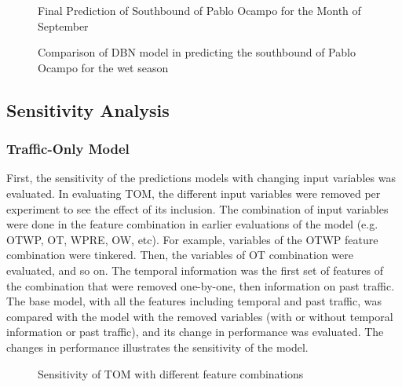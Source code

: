 \begin{figure}
  \centering
  \captionsetup{justification=centering}
  \caption{Final Prediction of Southbound of Pablo Ocampo for the Month of September}
  \label{fig:final_prediction}
\end{figure}


\begin{figure}
  \centering
  \captionsetup{justification=centering}
  \caption{Comparison of DBN model in predicting the southbound of Pablo Ocampo for the wet season}
  \label{fig:dbn_comp_pocampo}
\end{figure}



\subsection{Sensitivity Analysis}

\subsubsection{Traffic-Only Model}

First, the sensitivity of the predictions models with changing input variables was evaluated. In evaluating TOM, the different input variables were removed per experiment to see the effect of its inclusion. The combination of input variables were done in the feature combination in earlier evaluations of the model (e.g. OTWP, OT, WPRE, OW, etc). For example, variables of the OTWP feature combination were tinkered. Then, the variables of OT combination were evaluated, and so on. The temporal information was the first set of features of the combination that were removed one-by-one, then information on past traffic. The base model, with all the features including temporal and past traffic, was compared with the model with the removed variables (with or without temporal information or past traffic), and its change in performance was evaluated. The changes in performance illustrates the sensitivity of the model. 

\begin{figure}
  \centering
  \captionsetup{justification=centering}
  \caption{Sensitivity of TOM with different feature combinations}
  \label{fig:TOM_sensitivity}
\end{figure}


